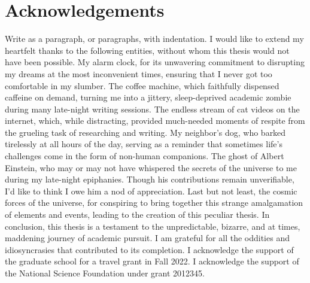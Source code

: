 \documentclass[12 pt]{report}
\begin{document}
\chapter*{Acknowledgements}
\noindent
Write as a paragraph, or paragraphs, with indentation. I would like to extend my heartfelt thanks to the following entities, without whom this thesis would not have been possible. My alarm clock, for its unwavering commitment to disrupting my dreams at the most inconvenient times, ensuring that I never got too comfortable in my slumber.
The coffee machine, which faithfully dispensed caffeine on demand, turning me into a jittery, sleep-deprived academic zombie during many late-night writing sessions.
The endless stream of cat videos on the internet, which, while distracting, provided much-needed moments of respite from the grueling task of researching and writing.
My neighbor's dog, who barked tirelessly at all hours of the day, serving as a reminder that sometimes life's challenges come in the form of non-human companions.
The ghost of Albert Einstein, who may or may not have whispered the secrets of the universe to me during my late-night epiphanies. Though his contributions remain unverifiable, I'd like to think I owe him a nod of appreciation.
Last but not least, the cosmic forces of the universe, for conspiring to bring together this strange amalgamation of elements and events, leading to the creation of this peculiar thesis.
In conclusion, this thesis is a testament to the unpredictable, bizarre, and at times, maddening journey of academic pursuit. I am grateful for all the oddities and idiosyncrasies that contributed to its completion. I acknowledge the support of the graduate school for a travel grant in Fall 2022. I acknowledge the support of the National Science Foundation under grant 2012345.
\newpage

\renewcommand{\contentsname}{Table of Contents}
\tableofcontents
\newpage


{%
\renewcommand*{\addvspace}[1]{}
\let\oldnumberline\numberline
\renewcommand{\numberline}[1]{\figurename~\oldnumberline{#1:}}
\listoffigures%
}
\newpage


{%
\renewcommand*{\addvspace}[1]{}
\let\oldnumberline\numberline
\renewcommand{\numberline}[1]{\tablename~\oldnumberline{#1:}}
\listoftables%
}
\end{document}

